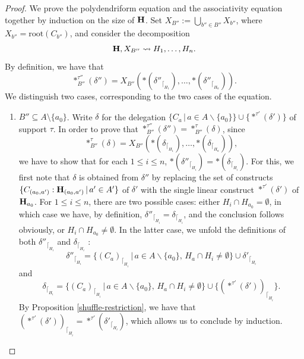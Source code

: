 \documentclass{article}
\theoremstyle{plain}
\theoremstyle{definition}
\newcommand{\inc}{\subseteq}
\newcommand{\Union}{\bigcup}
\newcommand{\set}[1]{\{#1\}}
\newcommand{\hyper}[1]{{\bf #1}}
\begin{document}
\begin{proof} We prove the polydendriform equation  and the associativity equation  together by induction on the size of ${\bf H}$.
Set $X_{B''}:=\Union_{b''\in B''}X_{b''}$, where $X_{b''}=\text{root}(C_{b''})$, and consider the decomposition 
$$\hyper{H},X_{B''}\leadsto H_1,\ldots,H_n.$$
By definition, we have that 
$$\ast^{\tau''}_{B''}(\delta'')=X_{B''}(\ast({\delta''}_{\lceil_{H_1}}),\dots,\ast({\delta''}_{\lceil_{H_n}})).$$
We distinguish two cases, corresponding to the two cases of the equation.
\begin{enumerate}
\item $B''\inc A\setminus\set{a_0}$. Write $\delta$ for the delegation $\{C_a\,|\,a\in A\backslash\{a_0\}\}\cup\{\ast^{\tau'}(\delta')\}$ of support $\tau$. In order to
 prove that $\ast^{\tau''}_{B''}(\delta'')=\ast^{\tau}_{B''}(\delta)$, since 
$$\ast^{\tau}_{B''}(\delta)=X_{B''}(\ast(\delta_{\lceil_{H_1}}),\dots,\ast(\delta_{\lceil_{H_n}})),$$
we have to show that for each $1\leq i\leq n$, $\ast({\delta''}_{\lceil_{H_i}})=\ast(\delta_{\lceil_{H_i}})$. For this, we first note that $\delta$ is obtained from $\delta''$ by replacing the set of  constructs $\{C_{(a_0,a')}:{\bf H}_{(a_0,a')}\,|\, a'\in A'\}$ of $\delta'$ with the single linear construct $\ast^{\tau'}(\delta')$ of ${\bf H}_{a_0}$. For $1\leq i\leq n$, there are two possible cases: either $H_i\cap H_{a_0}=\emptyset$, in which case we have, by definition, ${\delta''}_{\lceil_{H_i}}=\delta_{\lceil_{H_i}}$, and the conclusion follows obviously, or  $H_i\cap H_{a_0}\neq\emptyset$.  In the latter case, we unfold the definitions of both ${\delta''}_{\lceil_{H_i}}$ and $\delta_{\lceil_{H_i}}$ : $${\delta''}_{\lceil_{H_i}}=\{{(C_a)}_{\lceil_{H_i}}\,|\,a\in A\backslash\{a_0\},\, H_a\cap H_i\neq \emptyset\}\cup {\delta'}_{\lceil_{H_i}}$$
and $$\delta_{\lceil_{H_i}}=\{{(C_a)}_{\lceil_{H_i}}\,|\,a\in A\backslash\{a_0\},\, H_a\cap H_i\neq \emptyset\}\cup \{(\ast^{\tau'}(\delta'))_{\lceil_{H_i}}\}.$$
By Proposition \ref{shuffle-restriction}, we have that $(\ast^{\tau'}(\delta'))_{\lceil_{H_i}}=\ast^{\tau'}({\delta'}_{\lceil_{H_i}})$, which allows us to conclude by induction. 
 

\end{enumerate}
\end{proof}
\end{document}
